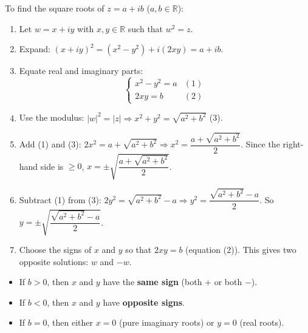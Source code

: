 \documentclass[11pt]{article}
\begin{document}
\begin{methode}
To find the square roots of $z = a+ib$ ($a,b \in \mathbb{R}$):
\begin{enumerate}
    \item Let $w = x+iy$ with $x,y \in \mathbb{R}$ such that $w^2 = z$.
    \item Expand: $(x+iy)^2 = (x^2-y^2) + i(2xy) = a + ib$.
    \item Equate real and imaginary parts:
          \[\begin{cases}
              x^2 - y^2 = a & (1)\\
              2xy = b       & (2)
          \end{cases}\]
    \item Use the modulus: $|w|^2 = |z| \Rightarrow x^2 + y^2 = \sqrt{a^2+b^2}$  (3).
    \item Add (1) and (3): $2x^2 = a + \sqrt{a^2+b^2} \Rightarrow x^2 = \dfrac{a + \sqrt{a^2+b^2}}{2}$.
          Since the right-hand side is $\ge 0$, $x = \pm \sqrt{\dfrac{a + \sqrt{a^2+b^2}}{2}}$.
    \item Subtract (1) from (3): $2y^2 = \sqrt{a^2+b^2} - a \Rightarrow y^2 = \dfrac{\sqrt{a^2+b^2} - a}{2}$.
          So $y = \pm \sqrt{\dfrac{\sqrt{a^2+b^2} - a}{2}}$.
    \item Choose the signs of $x$ and $y$ so that $2xy = b$ (equation (2)).  This gives two opposite solutions: $w$ and $-w$.
\end{enumerate}
\end{methode}

\begin{aretenir}
\begin{itemize}
    \item If $b > 0$, then $x$ and $y$ have the \textbf{same sign} (both $+$ or both $-$).
    \item If $b < 0$, then $x$ and $y$ have \textbf{opposite signs}.
    \item If $b = 0$, then either $x=0$ (pure imaginary roots) or $y=0$ (real roots).
\end{itemize}
\end{aretenir}
\end{document}
